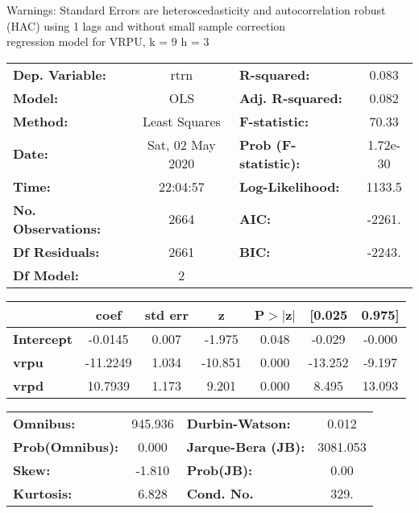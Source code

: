 Warnings: \newline
 [1] Standard Errors are heteroscedasticity and autocorrelation robust (HAC) using 1 lags and without small sample correction\\ 

regression model for VRPU, k = 9 h = 3\begin{center}
\begin{tabular}{lclc}
\toprule
\textbf{Dep. Variable:}    &       rtrn       & \textbf{  R-squared:         } &     0.083   \\
\textbf{Model:}            &       OLS        & \textbf{  Adj. R-squared:    } &     0.082   \\
\textbf{Method:}           &  Least Squares   & \textbf{  F-statistic:       } &     70.33   \\
\textbf{Date:}             & Sat, 02 May 2020 & \textbf{  Prob (F-statistic):} &  1.72e-30   \\
\textbf{Time:}             &     22:04:57     & \textbf{  Log-Likelihood:    } &    1133.5   \\
\textbf{No. Observations:} &        2664      & \textbf{  AIC:               } &    -2261.   \\
\textbf{Df Residuals:}     &        2661      & \textbf{  BIC:               } &    -2243.   \\
\textbf{Df Model:}         &           2      & \textbf{                     } &             \\
\bottomrule
\end{tabular}
\begin{tabular}{lcccccc}
                   & \textbf{coef} & \textbf{std err} & \textbf{z} & \textbf{P$> |$z$|$} & \textbf{[0.025} & \textbf{0.975]}  \\
\midrule
\textbf{Intercept} &      -0.0145  &        0.007     &    -1.975  &         0.048        &       -0.029    &       -0.000     \\
\textbf{vrpu}      &     -11.2249  &        1.034     &   -10.851  &         0.000        &      -13.252    &       -9.197     \\
\textbf{vrpd}      &      10.7939  &        1.173     &     9.201  &         0.000        &        8.495    &       13.093     \\
\bottomrule
\end{tabular}
\begin{tabular}{lclc}
\textbf{Omnibus:}       & 945.936 & \textbf{  Durbin-Watson:     } &    0.012  \\
\textbf{Prob(Omnibus):} &   0.000 & \textbf{  Jarque-Bera (JB):  } & 3081.053  \\
\textbf{Skew:}          &  -1.810 & \textbf{  Prob(JB):          } &     0.00  \\
\textbf{Kurtosis:}      &   6.828 & \textbf{  Cond. No.          } &     329.  \\
\bottomrule
\end{tabular}
\end{center}


